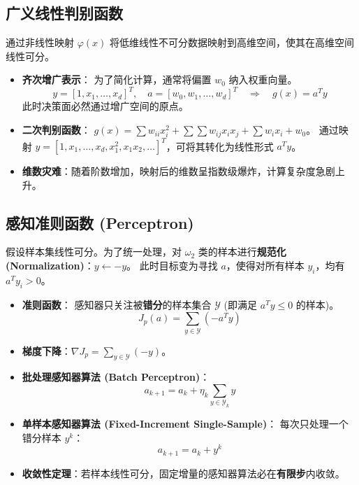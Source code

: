 \documentclass[a4paper, 11pt]{ctexart}
\begin{document}
\subsection{广义线性判别函数}
通过非线性映射 $\varphi(x)$ 将低维线性不可分数据映射到高维空间，使其在高维空间线性可分。
\begin{itemize}
    \item \textbf{齐次增广表示}：
    为了简化计算，通常将偏置 $w_0$ 纳入权重向量。
    \begin{equation}
        y = [1, x_1, \dots, x_d]^T, \quad a = [w_0, w_1, \dots, w_d]^T \quad \Rightarrow \quad g(x) = a^T y
    \end{equation}
    此时决策面必然通过增广空间的原点。
    \item \textbf{二次判别函数}：
    $g(x) = \sum w_{ii} x_i^2 + \sum \sum w_{ij} x_i x_j + \sum w_i x_i + w_0$。
    通过映射 $y = [1, x_1, \dots, x_d, x_1^2, x_1 x_2, \dots]^T$，可将其转化为线性形式 $a^T y$。
    \item \textbf{维数灾难}：随着阶数增加，映射后的维数呈指数级爆炸，计算复杂度急剧上升。
\end{itemize}

\subsection{感知准则函数 (Perceptron)}
假设样本集线性可分。为了统一处理，对 $\omega_2$ 类的样本进行\textbf{规范化 (Normalization)}：$y \leftarrow -y$。
此时目标变为寻找 $a$，使得对所有样本 $y_i$，均有 $a^T y_i > 0$。

\begin{itemize}
    \item \textbf{准则函数}：
    感知器只关注被\textbf{错分}的样本集合 $\mathcal{Y}$ (即满足 $a^T y \le 0$ 的样本)。
    \begin{equation}
        J_p(a) = \sum_{y \in \mathcal{Y}} (-a^T y)
    \end{equation}
    \item \textbf{梯度下降}：$\nabla J_p = \sum_{y \in \mathcal{Y}} (-y)$。
    \item \textbf{批处理感知器算法 (Batch Perceptron)}：
    \begin{equation}
        a_{k+1} = a_k + \eta_k \sum_{y \in \mathcal{Y}_k} y
    \end{equation}
    \item \textbf{单样本感知器算法 (Fixed-Increment Single-Sample)}：
    每次只处理一个错分样本 $y^k$：
    \begin{equation}
        a_{k+1} = a_k + y^k
    \end{equation}
    \item \textbf{收敛性定理}：若样本线性可分，固定增量的感知器算法必在\textbf{有限步}内收敛。
\end{itemize}
\end{document}
